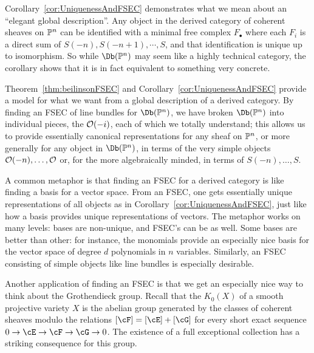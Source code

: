 \documentclass{amsart}
\begin{document}
\begin{remark}
  Corollary~\ref{cor:UniquenessAndFSEC} demonstrates what we mean about an ``elegant global description''.  Any object in the derived category of coherent sheaves on $\mathbb P^n$ can be identified with a minimal free complex $F_\bullet$ where each $F_i$ is a direct sum of $S(-n), S(-n+1), \cdots, S$, and that identification is unique up to isomorphism.  So while $\Db(\PP^n)$ may seem like a highly technical category, the corollary shows that it is in fact equivalent to something very concrete.

  Theorem~\ref{thm:beilinsonFSEC} and Corollary~\ref{cor:UniquenessAndFSEC} provide a model for what we want from a global description of a derived category.  By finding an FSEC of line bundles for $\Db(\PP^n)$, we have broken $\Db(\PP^n)$ into individual pieces, the ${\mathcal O}(-i)$, each of which we totally understand; this allows us to provide essentially canonical representations for any sheaf on $\mathbb P^n$, or more generally for any object in $\Db(\PP^n)$, in terms of the very simple objects ${\mathcal O}(-n), \dots, {\mathcal O}$ or, for the more algebraically minded, in terms of $S(-n), \dots, S$.

  A common metaphor is that finding an FSEC for a derived category is like finding a basis for a vector space.  From an FSEC, one gets essentially unique representations of all objects as in Corollary~\ref{cor:UniquenessAndFSEC}, just like how a basis provides unique representations of vectors.  The metaphor works on many levels:  bases are non-unique, and FSEC's can be as well.  Some bases are better than other: for instance, the monomials provide an especially nice basis for the vector space of degree $d$ polynomials in $n$ variables.  Similarly, an FSEC consisting of simple objects like line bundles is especially desirable.
\end{remark}


Another application of finding an FSEC is that we get an especially nice way to think about the Grothendieck group.  Recall that the  $K_0(X)$ of a smooth projective variety $X$ is the abelian group 
generated by the classes of coherent sheaves modulo the relations $[\cF]=[\cE]+[\cG]$ for every short exact sequence $0\to\cE\to\cF\to\cG\to 0$. The existence of a full exceptional collection has a striking consequence for this group.
\end{document}
